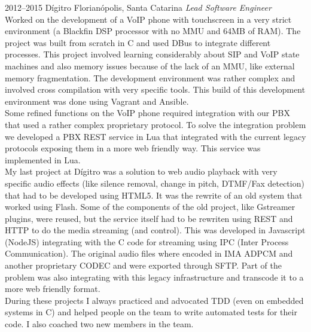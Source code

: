 \documentclass[]{friggeri-cv} %
\begin{document}
\begin{entrylist}
\entry
{2012--2015}
{Dígitro}
{Florianópolis, Santa Catarina}
{\emph{Lead Software Engineer} \\

Worked on the development of a VoIP phone with touchscreen
in a very strict environment
(a Blackfin DSP processor with no MMU and 64MB of RAM).
The project was built from scratch in C and used
DBus to integrate different processes. This project involved
learning considerably about SIP and VoIP state machines
and also memory issues because of the lack of an MMU, like
external memory fragmentation. The development environment
was rather complex and involved cross compilation with
very specific tools. This build of this development environment
was done using Vagrant and Ansible. \\

Some refined functions on the VoIP phone required integration
with our PBX that used a rather complex proprietary protocol.
To solve the integration problem we developed a PBX
REST service in Lua that integrated with the current legacy
protocols exposing them in a more web friendly way. This service
was implemented in Lua. \\

My last project at Dígitro was a solution to web audio playback
with very specific audio effects (like silence removal,
change in pitch, DTMF/Fax detection) that had to be developed using HTML5.
It was the rewrite of an old system that worked using Flash.
Some of the components of the old project, like Gstreamer
plugins, were reused, but the service itself had to be rewriten
using REST and HTTP to do the media streaming (and control).
This was developed in Javascript (NodeJS) integrating with the
C code for streaming using IPC (Inter Process Communication).
The original audio files where encoded in IMA ADPCM and another
proprietary CODEC and were exported through SFTP. Part of the
problem was also integrating with this legacy infrastructure and
transcode it to a more web friendly format. \\

During these projects I always practiced and advocated TDD
(even on embedded systems in C) and helped people on
the team to write automated tests for their code. I also
coached two new members in the team.
}
\end{entrylist}
\end{document}

